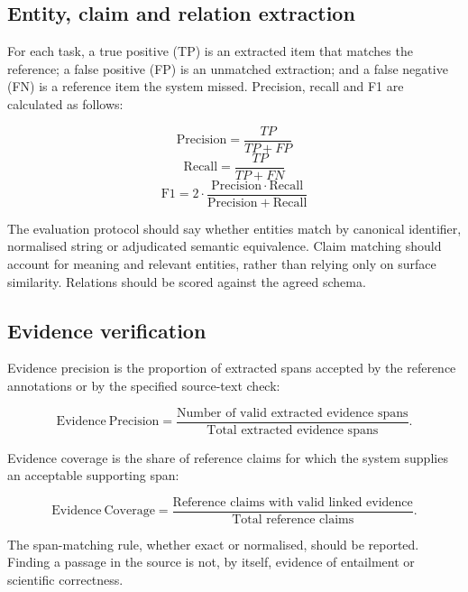 \documentclass[11pt,a4paper]{article}
\begin{document}
\subsection{Entity, claim and relation extraction}

For each task, a true positive (TP) is an extracted item that matches the reference; a false positive (FP) is an unmatched extraction; and a false negative (FN) is a reference item the system missed. Precision, recall and F1 are calculated as follows:

\begin{equation}
\mathrm{Precision}=\frac{TP}{TP+FP}
\end{equation}
\begin{equation}
\mathrm{Recall}=\frac{TP}{TP+FN}
\end{equation}
\begin{equation}
\mathrm{F1}=2\cdot\frac{\mathrm{Precision}\cdot\mathrm{Recall}}
{\mathrm{Precision}+\mathrm{Recall}}
\end{equation}

The evaluation protocol should say whether entities match by canonical identifier, normalised string or adjudicated semantic equivalence. Claim matching should account for meaning and relevant entities, rather than relying only on surface similarity. Relations should be scored against the agreed schema.

\subsection{Evidence verification}

Evidence precision is the proportion of extracted spans accepted by the reference annotations or by the specified source-text check:

\begin{equation}
\mathrm{Evidence\ Precision} =
\frac{\text{Number of valid extracted evidence spans}}
{\text{Total extracted evidence spans}}.
\end{equation}

Evidence coverage is the share of reference claims for which the system supplies an acceptable supporting span:

\begin{equation}
\mathrm{Evidence\ Coverage} =
\frac{\text{Reference claims with valid linked evidence}}
{\text{Total reference claims}}.
\end{equation}

The span-matching rule, whether exact or normalised, should be reported. Finding a passage in the source is not, by itself, evidence of entailment or scientific correctness.
\end{document}
